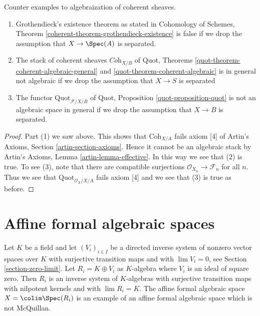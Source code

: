 \begin{lemma}
\label{lemma-counter-Grothendieck-existence}
Counter examples to algebraization of coherent sheaves.
\begin{enumerate}
\item Grothendieck's existence theorem as stated in
Cohomology of Schemes, Theorem \ref{coherent-theorem-grothendieck-existence}
is false if we drop the assumption that $X \to \Spec(A)$ is separated.
\item The stack of coherent sheaves $\textit{Coh}_{X/B}$
of Quot, Theorems \ref{quot-theorem-coherent-algebraic-general} and
\ref{quot-theorem-coherent-algebraic} is in general
not algebraic if we drop the assumption that $X \to S$ is separated
\item The functor $\text{Quot}_{\mathcal{F}/X/B}$ of
Quot, Proposition \ref{quot-proposition-quot}
is not an algebraic space in general if we drop the assumption
that $X \to B$ is separated.
\end{enumerate}
\end{lemma}

\begin{proof}
Part (1) we saw above. This shows that $\text{Coh}_{X/A}$ fails
axiom [4] of Artin's Axioms, Section \ref{artin-section-axioms}. Hence it
cannot be an algebraic stack by Artin's Axioms, Lemma
\ref{artin-lemma-effective}.
In this way we see that (2) is true. To see (3), note that
there are compatible surjections $\mathcal{O}_{X_n} \to \mathcal{F}_n$
for all $n$. Thus we see that $\text{Quot}_{\mathcal{O}_X/X/A}$
fails axiom [4] and we see that (3) is true as before.
\end{proof}






\section{Affine formal algebraic spaces}
\label{section-affine-formal-algebraic-space}

\noindent
Let $K$ be a field and let $(V_i)_{i \in I}$ be a directed inverse
system of nonzero vector spaces over $K$ with surjective transition maps and
with $\lim V_i = 0$, see Section \ref{section-zero-limit}.
Let $R_i = K \oplus V_i$ as $K$-algebra where $V_i$ is
an ideal of square zero. Then $R_i$ is an inverse system of
$K$-algebras with surjective transition maps with nilpotent kernels
and with $\lim R_i = K$. The affine formal
algebraic space $X = \colim \Spec(R_i)$ is an example of an affine
formal algebraic space which is not McQuillan.

